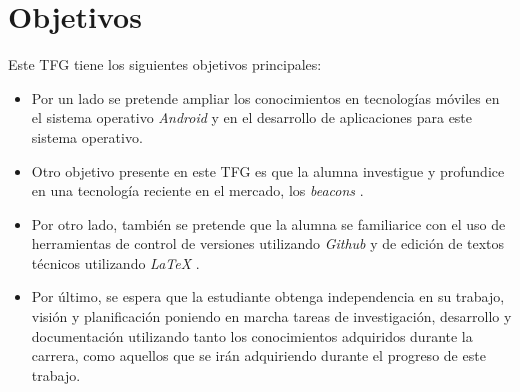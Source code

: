 %
%
%
%


\chapter{Objetivos} \label{chap:Objetivos}  

Este TFG tiene los siguientes objetivos principales:

	
\begin{itemize}
\item  	Por un lado se pretende ampliar los conocimientos en tecnologías móviles en el sistema operativo \textit{Android} \cite{URL::Android} y en el desarrollo de aplicaciones para este sistema operativo.
\item Otro objetivo presente en este TFG es que la alumna investigue y profundice en una tecnología reciente en el mercado, los \textit{beacons} \cite{URL::Beacon}.
\item Por otro lado, también se pretende que la alumna se familiarice con el uso de herramientas de control de versiones utilizando \textit{Github} \cite{URL::Github} y de edición de textos técnicos utilizando \textit{LaTeX}  \cite{URL::LaTeX}.
\item  Por último, se espera que la estudiante obtenga independencia en su trabajo, visión y planificación poniendo en marcha tareas de investigación, desarrollo y documentación utilizando tanto los conocimientos adquiridos durante la carrera, como aquellos que se irán adquiriendo durante el progreso de este trabajo.
\end{itemize}